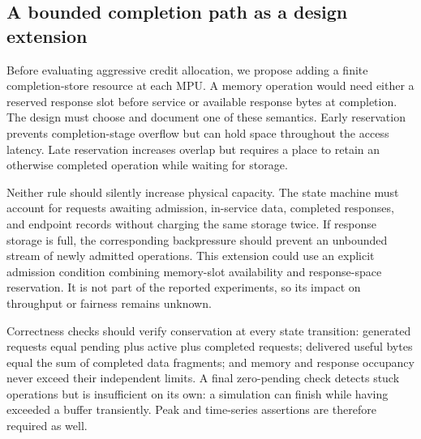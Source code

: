 \subsection{A bounded completion path as a design extension}
Before evaluating aggressive credit allocation, we propose adding a finite completion-store resource at each MPU. A memory operation would need either a reserved response slot before service or available response bytes at completion. The design must choose and document one of these semantics. Early reservation prevents completion-stage overflow but can hold space throughout the access latency. Late reservation increases overlap but requires a place to retain an otherwise completed operation while waiting for storage.

Neither rule should silently increase physical capacity. The state machine must account for requests awaiting admission, in-service data, completed responses, and endpoint records without charging the same storage twice. If response storage is full, the corresponding backpressure should prevent an unbounded stream of newly admitted operations. This extension could use an explicit admission condition combining memory-slot availability and response-space reservation. It is not part of the reported experiments, so its impact on throughput or fairness remains unknown.

Correctness checks should verify conservation at every state transition: generated requests equal pending plus active plus completed requests; delivered useful bytes equal the sum of completed data fragments; and memory and response occupancy never exceed their independent limits. A final zero-pending check detects stuck operations but is insufficient on its own: a simulation can finish while having exceeded a buffer transiently. Peak and time-series assertions are therefore required as well.
